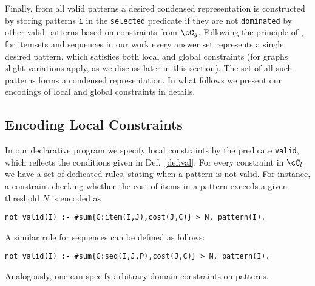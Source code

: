 Finally, from all valid patterns a desired condensed representation is constructed by storing patterns \texttt{i} in the \texttt{selected} predicate if they are not \texttt{dominated} by other valid patterns based on constraints from $\cC_g$. Following the principle of \parencite{DBLP:conf/lpnmr/Jarvisalo11}, for itemsets and sequences in our work every answer set represents a single desired pattern, which satisfies both local and global constraints (for graphs slight variations apply, as we discuss later in this section). The set of all such patterns forms a condensed representation. In what follows we present our encodings of local and global constraints in details. 

\subsection{Encoding Local Constraints} 

In our declarative program we specify local constraints by the predicate \texttt{valid}, which reflects the conditions given in Def.~\ref{def:val}. For every constraint in $\cC_l$ we have a set of dedicated rules, stating when a pattern is not valid. 
For instance, a constraint checking whether the cost of items in a pattern exceeds a given threshold $N$ is encoded as %

\small{\begin{center}
\texttt{not\_valid(I) :- \#sum\{C:item(I,J),cost(J,C)\} > N, pattern(I).}
\end{center}}

\normalsize{A similar rule for sequences can be defined as follows: }%

\small{\begin{center}
\texttt{not\_valid(I) :- \#sum\{C:seq(I,J,P),cost(J,C)\} > N, pattern(I).}
\end{center}}

 
\normalsize{Analogously, one can specify arbitrary domain constraints on patterns. }

